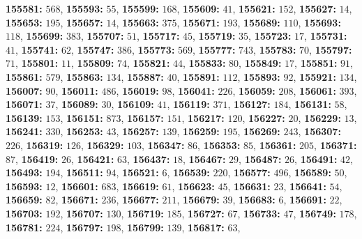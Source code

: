 \textsf{\bfseries 155581:} $568$, \textsf{\bfseries 155593:} $55$, \textsf{\bfseries 155599:} $168$, \textsf{\bfseries 155609:} $41$, \textsf{\bfseries 155621:} $152$, \textsf{\bfseries 155627:} $14$, \textsf{\bfseries 155653:} $195$, \textsf{\bfseries 155657:} $14$, \textsf{\bfseries 155663:} $375$, \textsf{\bfseries 155671:} $193$, \textsf{\bfseries 155689:} $110$, \textsf{\bfseries 155693:} $118$, \textsf{\bfseries 155699:} $383$, \textsf{\bfseries 155707:} $51$, \textsf{\bfseries 155717:} $45$, \textsf{\bfseries 155719:} $35$, \textsf{\bfseries 155723:} $17$, \textsf{\bfseries 155731:} $41$, \textsf{\bfseries 155741:} $62$, \textsf{\bfseries 155747:} $386$, \textsf{\bfseries 155773:} $569$, \textsf{\bfseries 155777:} $743$, \textsf{\bfseries 155783:} $70$, \textsf{\bfseries 155797:} $71$, \textsf{\bfseries 155801:} $11$, \textsf{\bfseries 155809:} $74$, \textsf{\bfseries 155821:} $44$, \textsf{\bfseries 155833:} $80$, \textsf{\bfseries 155849:} $17$, \textsf{\bfseries 155851:} $91$, \textsf{\bfseries 155861:} $579$, \textsf{\bfseries 155863:} $134$, \textsf{\bfseries 155887:} $40$, \textsf{\bfseries 155891:} $112$, \textsf{\bfseries 155893:} $92$, \textsf{\bfseries 155921:} $134$, \textsf{\bfseries 156007:} $90$, \textsf{\bfseries 156011:} $486$, \textsf{\bfseries 156019:} $98$, \textsf{\bfseries 156041:} $226$, \textsf{\bfseries 156059:} $208$, \textsf{\bfseries 156061:} $393$, \textsf{\bfseries 156071:} $37$, \textsf{\bfseries 156089:} $30$, \textsf{\bfseries 156109:} $41$, \textsf{\bfseries 156119:} $371$, \textsf{\bfseries 156127:} $184$, \textsf{\bfseries 156131:} $58$, \textsf{\bfseries 156139:} $153$, \textsf{\bfseries 156151:} $873$, \textsf{\bfseries 156157:} $151$, \textsf{\bfseries 156217:} $120$, \textsf{\bfseries 156227:} $20$, \textsf{\bfseries 156229:} $13$, \textsf{\bfseries 156241:} $330$, \textsf{\bfseries 156253:} $43$, \textsf{\bfseries 156257:} $139$, \textsf{\bfseries 156259:} $195$, \textsf{\bfseries 156269:} $243$, \textsf{\bfseries 156307:} $226$, \textsf{\bfseries 156319:} $126$, \textsf{\bfseries 156329:} $103$, \textsf{\bfseries 156347:} $86$, \textsf{\bfseries 156353:} $85$, \textsf{\bfseries 156361:} $205$, \textsf{\bfseries 156371:} $87$, \textsf{\bfseries 156419:} $26$, \textsf{\bfseries 156421:} $63$, \textsf{\bfseries 156437:} $18$, \textsf{\bfseries 156467:} $29$, \textsf{\bfseries 156487:} $26$, \textsf{\bfseries 156491:} $42$, \textsf{\bfseries 156493:} $194$, \textsf{\bfseries 156511:} $94$, \textsf{\bfseries 156521:} $6$, \textsf{\bfseries 156539:} $220$, \textsf{\bfseries 156577:} $496$, \textsf{\bfseries 156589:} $50$, \textsf{\bfseries 156593:} $12$, \textsf{\bfseries 156601:} $683$, \textsf{\bfseries 156619:} $61$, \textsf{\bfseries 156623:} $45$, \textsf{\bfseries 156631:} $23$, \textsf{\bfseries 156641:} $54$, \textsf{\bfseries 156659:} $82$, \textsf{\bfseries 156671:} $236$, \textsf{\bfseries 156677:} $211$, \textsf{\bfseries 156679:} $39$, \textsf{\bfseries 156683:} $6$, \textsf{\bfseries 156691:} $22$, \textsf{\bfseries 156703:} $192$, \textsf{\bfseries 156707:} $130$, \textsf{\bfseries 156719:} $185$, \textsf{\bfseries 156727:} $67$, \textsf{\bfseries 156733:} $47$, \textsf{\bfseries 156749:} $178$, \textsf{\bfseries 156781:} $224$, \textsf{\bfseries 156797:} $198$, \textsf{\bfseries 156799:} $139$, \textsf{\bfseries 156817:} $63$, 
